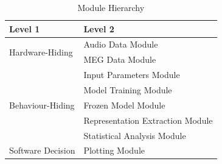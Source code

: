 \documentclass[12pt, titlepage]{article}
\begin{document}
\begin{table}[h!]
\centering
\begin{tabular}{p{} p{}}
\toprule
\textbf{Level 1} & \textbf{Level 2}\\
\midrule

\multirow{2}{0.3\textwidth}{Hardware-Hiding}
& Audio Data Module\\
& MEG Data Module\\
\midrule

\multirow{5}{0.3\textwidth}{Behaviour-Hiding}
& Input Parameters Module\\
& Model Training Module\\
& Frozen Model Module\\
& Representation Extraction Module\\
& Statistical Analysis Module\\
\midrule

\multirow{1}{0.3\textwidth}{Software Decision}
& Plotting Module\\
\bottomrule
\end{tabular}
\caption{Module Hierarchy}
\label{TblMH}
\end{table}







\newpage






\end{document}
